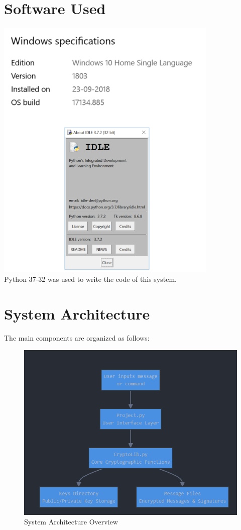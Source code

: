 \documentclass[12pt,a4paper]{report}
\begin{document}
\chapter{Software Used}
\includegraphics[width=0.8\textwidth]{screenshot-4.png}\\[1cm]
Python 37-32 was used to write the code of this system.

\chapter{System Architecture}
The main components are organized as follows:

\begin{figure}[h]
\includegraphics[width=\textwidth]{screenshot-2.png}
\caption{System Architecture Overview}
\end{figure}
\end{document}
